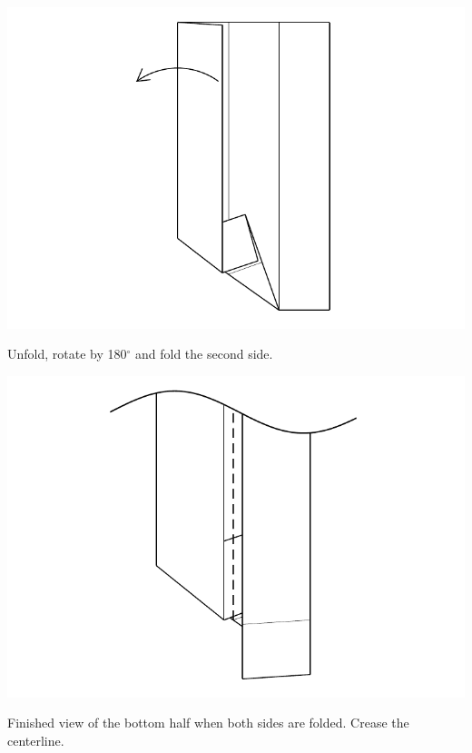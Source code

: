 \documentclass[11pt]{article}
\begin{document}
\begin{minipage}[t]{0.3\textwidth}
  \includegraphics[width=\textwidth]{../figs/fig05-06}
  \begin{itemize}{\item[6.] Unfold, rotate by 180$^\circ$ and fold the second side.}\end{itemize}
\end{minipage}

\vspace*{0.5in}

\begin{minipage}[t]{0.3\textwidth}
  \includegraphics[width=\textwidth]{../figs/fig05-07}
  \begin{itemize}{\item[7.] Finished view of the bottom half when both sides are folded.  Crease the centerline.}\end{itemize}
\end{minipage}
\end{document}
